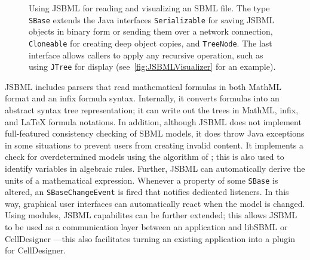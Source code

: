 \documentclass{bioinfo}
\begin{document}
\begin{methods}
\begin{figure}
{{{{\begin{minipage}[t][5.7cm][c]{.55\textwidth}
          
        \end{minipage}
      }
    }
  }\hspace{1cm}
}
\caption[Using JSBML for reading and visualizing an SBML file using
JSBML]{Using JSBML for reading and visualizing an SBML file. The type
\texttt{SBase} extends the Java interfaces \texttt{Serializable} for saving
JSBML objects in binary form or sending them over a network connection,
\texttt{Cloneable} for creating deep object copies, and \texttt{TreeNode}.
The last interface allows callers to apply any recursive operation, such as
using \texttt{JTree} for display (see~\ref{fig:JSBMLVisualizer} for an
example).}
\label{fig:JSBML}
\end{figure}

JSBML includes parsers that read mathematical formulas in both MathML
format and an infix formula syntax.  Internally, it converts formulas
into an abstract syntax tree representation; it can write out the
trees in MathML, infix, and \LaTeX{} formula notations.
In addition, although JSBML does not implement full-featured
consistency checking of SBML models, it does throw Java exceptions in some
situations to prevent users from creating invalid content.
It implements a check for overdetermined models
using the algorithm of \citet{Hopcroft1973}; this is 
also used to identify variables in algebraic rules. Further, JSBML can
automatically derive the units of a mathematical expression.
Whenever a property of some \texttt{SBase} is altered, an
\texttt{SBaseChangeEvent} is fired that notifies dedicated listeners. In this
way, graphical user interfaces can automatically react when the model is changed.
Using modules, JSBML capabilites can be further
extended; this allows JSBML to be used as a communication layer
between an application and libSBML or CellDesigner
\citep{Funahashi2003}---this also facilitates turning an existing application into
a plugin for CellDesigner.

\end{methods}
\end{document}

